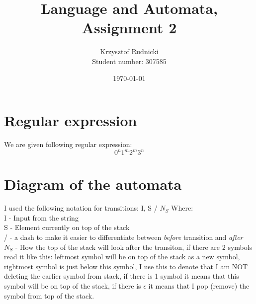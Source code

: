 \documentclass{report}[pt12]
\title{Language and Automata, Assignment 2}
\author{Krzysztof Rudnicki\\ Student number: 307585}
\date{\today}
\begin{document}
\maketitle

\chapter{Regular expression}
We are given following regular expression:
\[ 0^n1^m2^m3^n \]

\chapter{Diagram of the automata}
I used the following notation for transitions:
I, S / $N_S$
Where: \\
I - Input from the string \\
S - Element currently on top of the stack \\
/ - a dash to make it easier to differentiate between \emph{before} transition and \emph{after} \\
$N_S$ - How the top of the stack will look after the transiton, if there are 2 symbols read it like this: leftmost symbol will be on top of the stack as a new symbol, rightmost symbol is just below this symbol, I use this to denote that I am NOT deleting the earlier symbol from stack, if there is 1 symbol it means that this symbol will be on top of the stack, if there is $\epsilon$ it means that I pop (remove) the symbol from top of the stack.
\end{document}
